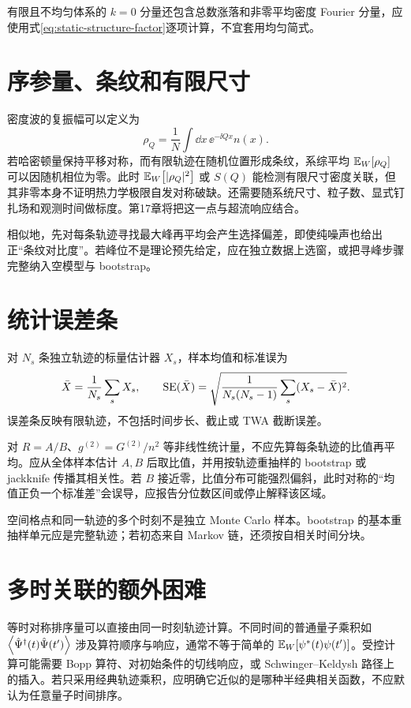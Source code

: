 有限且不均匀体系的 $k=0$ 分量还包含总数涨落和非零平均密度 Fourier 分量，应使用式\eqref{eq:static-structure-factor}逐项计算，不宜套用均匀简式。

\section{序参量、条纹和有限尺寸}

密度波的复振幅可以定义为
\begin{equation}
  \rho_Q=\frac{1}{N}\int\dd x\,
  \ee^{-\ii Qx}n(x).
  \label{eq:density-wave-amplitude}
\end{equation}
若哈密顿量保持平移对称，而有限轨迹在随机位置形成条纹，系综平均 $\mathbb{E}_{W}\!\left[\rho_Q\right]$ 可以因随机相位为零。此时
$\mathbb{E}_{W}\!\left[|\rho_Q|^2\right]$ 或 $S(Q)$ 能检测有限尺寸密度关联，但其非零本身不证明热力学极限自发对称破缺。还需要随系统尺寸、粒子数、显式钉扎场和观测时间做标度。第17章将把这一点与超流响应结合。

相似地，先对每条轨迹寻找最大峰再平均会产生选择偏差，即使纯噪声也给出正“条纹对比度”。若峰位不是理论预先给定，应在独立数据上选窗，或把寻峰步骤完整纳入空模型与 bootstrap。

\section{统计误差条}

对 $N_s$ 条独立轨迹的标量估计器 $X_s$，样本均值和标准误为
\begin{equation}
  \bar X=\frac{1}{N_s}\sum_sX_s,
  \qquad
  {\rm SE}(\bar X)=
  \sqrt{\frac{1}{N_s(N_s-1)}\sum_s(X_s-\bar X)^2}.
  \label{eq:monte-carlo-standard-error}
\end{equation}
误差条反映有限轨迹，不包括时间步长、截止或 TWA 截断误差。

对 $R=A/B$、$g^{(2)}=G^{(2)}/n^2$ 等非线性统计量，不应先算每条轨迹的比值再平均。应从全体样本估计 $A,B$ 后取比值，并用按轨迹重抽样的 bootstrap 或 jackknife 传播其相关性。若 $B$ 接近零，比值分布可能强烈偏斜，此时对称的“均值正负一个标准差”会误导，应报告分位数区间或停止解释该区域。

空间格点和同一轨迹的多个时刻不是独立 Monte Carlo 样本。bootstrap 的基本重抽样单元应是完整轨迹；若初态来自 Markov 链，还须按自相关时间分块。

\section{多时关联的额外困难}

等时对称排序量可以直接由同一时刻轨迹计算。不同时间的普通量子乘积如
$\left\langle \hat{\Psi}^{\dagger}(t)\hat{\Psi}(t')\right\rangle$ 涉及算符顺序与响应，通常不等于简单的
$\mathbb{E}_{W}\!\left[\psi^*(t)\psi(t')\right] $。受控计算可能需要 Bopp 算符、对初始条件的切线响应，或 Schwinger--Keldysh 路径上的插入。若只采用经典轨迹乘积，应明确它近似的是哪种半经典相关函数，不应默认为任意量子时间排序。

